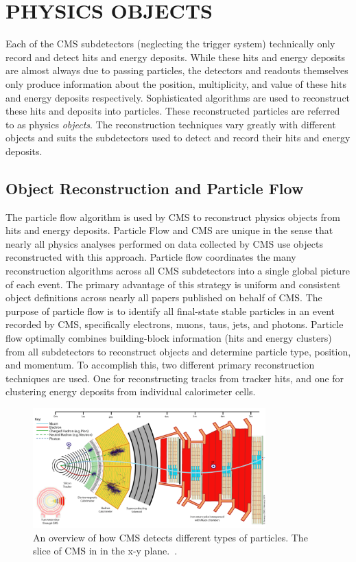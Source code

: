 %
%

\chapter{PHYSICS OBJECTS}
Each of the CMS subdetectors (neglecting the trigger system) technically only record and detect hits and energy deposits. While these hits and energy deposits are almost
always due to passing particles, the detectors and readouts themselves only produce information about the position, multiplicity, and value of
these hits and energy deposits respectively. Sophisticated algorithms are used to reconstruct these hits and deposits into particles. These reconstructed particles are
referred to as physics \emph{objects}. The reconstruction techniques vary greatly with different objects and suits the subdetectors used to detect and record their
hits and energy deposits. 

\section{Object Reconstruction and Particle Flow}
The particle flow algorithm is used by CMS to reconstruct physics objects from hits and energy deposits. Particle Flow and CMS are unique in the sense
that nearly all physics analyses performed on data collected by CMS use objects reconstructed with this approach.
Particle flow coordinates the many reconstruction algorithms across all CMS subdetectors into a single global picture of each event. The primary advantage of this strategy is
uniform and consistent object definitions across nearly all papers published on behalf of CMS. The purpose of particle flow is to
identify all final-state stable particles in an event recorded by CMS, specifically electrons,
muons, taus, jets, and photons. Particle flow optimally combines building-block information (hits and energy clusters) from all subdetectors to reconstruct objects and
determine particle type, position, and momentum. To accomplish this, two different primary reconstruction techniques are used. One for reconstructing tracks from tracker hits,
and one for clustering energy deposits from individual calorimeter cells. 

\begin{figure}[hbtp]
 \begin{center}
   \includegraphics[width=0.8\textwidth]{ch4_figs/cms_particleflow.pdf}
   \caption[CMS slice in the x-y plane]{An overview of how CMS detects different types of particles. The slice of CMS in in the x-y plane.~\cite{cms_pflow_img}.}
   \label{fig:cms_pflow}
 \end{center}
\end{figure}

